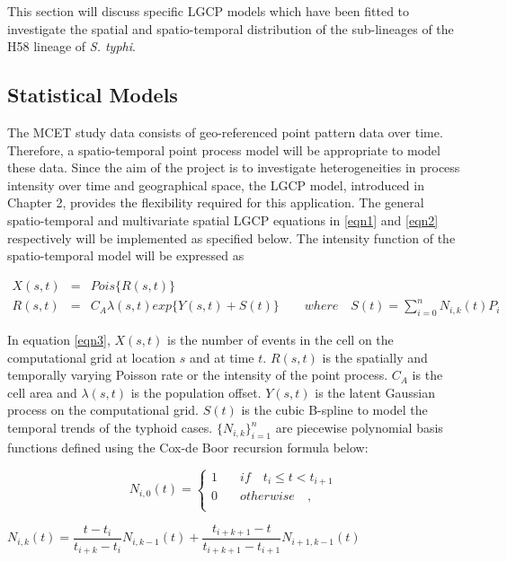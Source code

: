 \documentclass[12pt,a4paper]{report}
\begin{document}
This section will discuss specific LGCP models which have been fitted to investigate the spatial and spatio-temporal distribution of the sub-lineages of the H58 lineage of \textit{S. typhi}.

\subsection{Statistical Models}

The MCET study data consists of geo-referenced point pattern data over time. Therefore, a spatio-temporal point process model will be appropriate to model these data. Since the aim of the project is to investigate heterogeneities in process intensity over time and geographical space, the LGCP model, introduced in Chapter 2, provides the flexibility required for this application. The general spatio-temporal and multivariate spatial LGCP equations in  \ref{eqn1} and \ref{eqn2} respectively will be implemented as specified below. The intensity function of the spatio-temporal model will be expressed as

\begin{eqnarray}\label{eqn3}
X(s,t) &=& Pois \lbrace R(s,t)\rbrace \nonumber \\
R(s,t) &=& C_A \lambda(s,t) exp \lbrace Y(s,t) + S(t)\rbrace \quad \quad where \quad S(t) = \displaystyle \sum_{i=0}^{n} N_{i,k}(t)P_i
\end{eqnarray}

In equation \ref{eqn3}, $X(s,t)$ is the number of events in the cell on the computational grid at location $s$ and at time $t$. $R(s,t)$ is the spatially and temporally varying Poisson rate or the intensity of the point process. $C_A$ is the cell area and $\lambda(s,t)$ is the population offset. $Y(s,t)$ is the latent Gaussian process on the computational grid. $S(t)$ is the cubic B-spline to model the temporal trends of the typhoid cases. $\lbrace N_{i,k} \rbrace_{i=1}^n$ are piecewise polynomial basis functions defined using the Cox-de Boor recursion formula below:

\begin{equation*}
N_{i,0}(t) = \left\{ \begin{array}{cl}
1 & \quad if \quad t_i \leq t < t_{i+1}\\
0 & \quad otherwise \quad ,\\
\end{array} \right.
\end{equation*}

\begin{center}
$N_{i,k}(t) = \dfrac{t - t_i}{t_{i+k} - t_i} N_{i,k-1}(t) + \dfrac{t_{i+k+1}-t}{t_{i+k+1}-t_{i+1}} N_{i+1,k-1}(t)$
\end{center}
\end{document}
